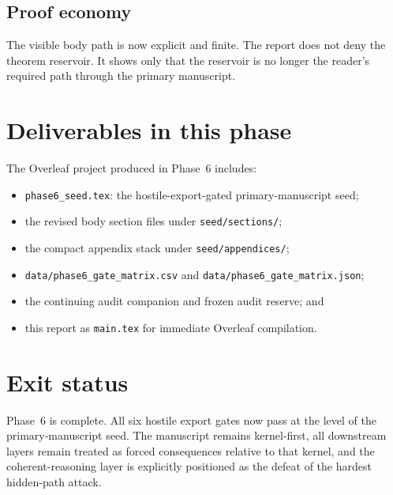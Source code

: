 \documentclass[11pt]{article}
\begin{document}
\subsection*{Proof economy}
The visible body path is now explicit and finite. The report does not deny the theorem reservoir. It shows only that the reservoir is no longer the reader's required path through the primary manuscript.

\section{Deliverables in this phase}
The Overleaf project produced in Phase~6 includes:
\begin{itemize}
    \item \texttt{phase6\_seed.tex}: the hostile-export-gated primary-manuscript seed;
    \item the revised body section files under \texttt{seed/sections/};
    \item the compact appendix stack under \texttt{seed/appendices/};
    \item \texttt{data/phase6\_gate\_matrix.csv} and \texttt{data/phase6\_gate\_matrix.json};
    \item the continuing audit companion and frozen audit reserve; and
    \item this report as \texttt{main.tex} for immediate Overleaf compilation.
\end{itemize}

\section{Exit status}
Phase~6 is complete. All six hostile export gates now pass at the level of the primary-manuscript seed. The manuscript remains kernel-first, all downstream layers remain treated as forced consequences relative to that kernel, and the coherent-reasoning layer is explicitly positioned as the defeat of the hardest hidden-path attack.
\end{document}
